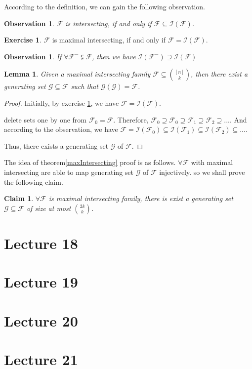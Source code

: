 \documentclass{article}
\newtheorem{lemma}[theorem]{Lemma}
\newtheorem{claim}[theorem]{Claim}
\newtheorem{observation}[theorem]{Observation}
\theoremstyle{definition}
\newtheorem{exercise}[theorem]{Exercise}
\begin{document}
According to the definition, we can gain the following observation. 

\begin{observation}
    $\mathcal{F}$ is intersecting, if and only if $\mathcal{F}\subseteq \mathcal{I}(\mathcal{F})$.
\end{observation}

\begin{exercise}\label{exer}
    $\mathcal{F}$ is maximal intersecting, if and only if $\mathcal{F}=\mathcal{I}(\mathcal{F})$.
\end{exercise}

\begin{observation}
    If $\forall \mathcal{F^{-}} \subsetneqq \mathcal{F}$, then we have $\mathcal{I}(\mathcal{F}^-)\supseteq \mathcal{I}(\mathcal{F})$ 
\end{observation}

\begin{lemma}
    Given a maximal intersecting family $\mathcal{F}\subseteq \binom{[n]}{k}$, then there exist a generating set $\mathcal{G}\subseteq \mathcal{F}$ such that $\mathcal{G}(\mathcal{G})=\mathcal{F}$.
\end{lemma}
\begin{proof}
    Initially, by exercise \ref{exer}, we have $\mathcal{F} =\mathcal{I}(\mathcal{F})$.

    delete sets one by one from $\mathcal{F}_0=\mathcal{F}$. Therefore, $\mathcal{F}_0\supseteq \mathcal{F}_0\supseteq\mathcal{F}_1\supseteq\mathcal{F}_2\supseteq...$. And according to the observation, we have $\mathcal{F}=\mathcal{I}(\mathcal{F}_0)\subseteq\mathcal{I}(\mathcal{F}_1)\subseteq\mathcal{I}(\mathcal{F}_2)\subseteq ...$. 

    Thus, there exists a generating set $\mathcal{G}$ of $\mathcal{F}$.
\end{proof}

The idea of theorem\ref{maxIntersecting} proof is as follows.
$\forall \mathcal{F}$ with maximal intersecting are able to map generating set $\mathcal{G}$ of $\mathcal{F}$ injectively. so we shall prove the following claim.
\begin{claim}
    $\forall \mathcal{F}$ is maximal intersecting family, there is exist a generating set $\mathcal{G}\subseteq \mathcal{F}$ of size at most $\binom{2k}{k}$.
\end{claim}

\newpage
\section{Lecture 18}



\newpage
\section{Lecture 19}



\newpage
\section{Lecture 20}



\newpage
\section{Lecture 21}



\newpage


\label{key}
\end{document}
